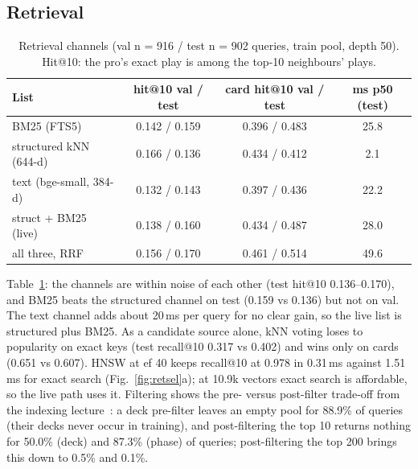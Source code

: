 \documentclass[conference]{IEEEtran}
\begin{document}
\subsection{Retrieval}
\label{sec:retr}

\begin{table}[t]
\caption{Retrieval channels (val n = 916 / test n = 902 queries, train pool, depth 50). Hit@10: the pro's exact play is among the top-10 neighbours' plays.}
\label{tab:retrieval}
\centering\scriptsize
\setlength{\tabcolsep}{3.5pt}
\begin{tabular}{@{}lccc@{}}
\toprule
List & hit@10 val / test & card hit@10 val / test & ms p50 (test)\\
\midrule
BM25 (FTS5) & 0.142 / 0.159 & 0.396 / 0.483 & 25.8\\
structured kNN (644-d) & 0.166 / 0.136 & 0.434 / 0.412 & 2.1\\
text (bge-small, 384-d) & 0.132 / 0.143 & 0.397 / 0.436 & 22.2\\
struct + BM25 (live) & 0.138 / 0.160 & 0.434 / 0.487 & 28.0\\
all three, RRF & 0.156 / 0.170 & 0.461 / 0.514 & 49.6\\
\bottomrule
\end{tabular}
\end{table}

Table~\ref{tab:retrieval}: the channels are within noise of each other (test hit@10 0.136--0.170), and BM25 beats the structured channel on test (0.159 vs 0.136) but not on val. The text channel adds about 20\,ms per query for no clear gain, so the live list is structured plus BM25. As a candidate source alone, kNN voting loses to popularity on exact keys (test recall@10 0.317 vs 0.402) and wins only on cards (0.651 vs 0.607). %
HNSW at ef 40 keeps recall@10 at 0.978 in 0.31\,ms against 1.51\,ms for exact search (Fig.~\ref{fig:retsel}a); at 10.9k vectors exact search is affordable, so the live path uses it. Filtering shows the pre- versus post-filter trade-off from the indexing lecture~\cite{cap6938L09}: a deck pre-filter leaves an empty pool for 88.9\% of queries (their decks never occur in training), and post-filtering the top 10 returns nothing for 50.0\% (deck) and 87.3\% (phase) of queries; post-filtering the top 200 brings this down to 0.5\% and 0.1\%. %
\end{document}
